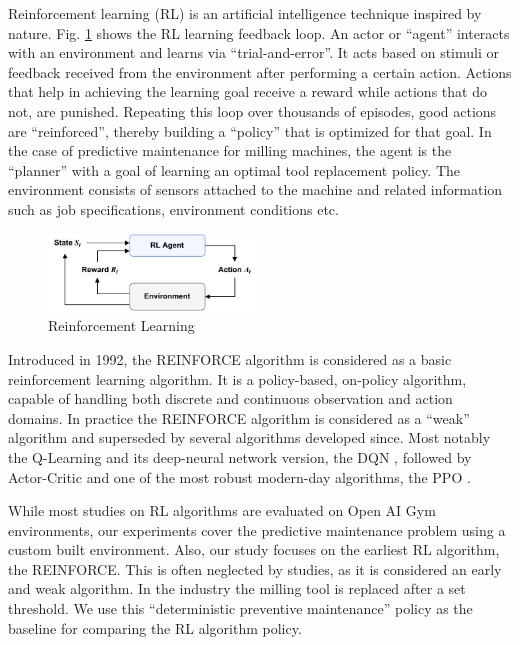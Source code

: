 \documentclass[a4paper, 12pt]{article}
\begin{document}
Reinforcement learning (RL) is an artificial intelligence technique inspired by nature. Fig. \ref{fig:RL-loop} \citep{barto2018} shows the RL learning feedback loop. An actor or ``agent'' interacts with an environment and learns via ``trial-and-error''. It acts based on stimuli or feedback received from the environment after performing a certain action. Actions that help in achieving the learning goal receive a reward while actions that do not, are punished. Repeating this loop over thousands of episodes, good actions are ``reinforced'', thereby building a ``policy'' that is optimized for that goal. In the case of predictive maintenance for milling machines, the agent is the ``planner'' with a goal of learning an optimal tool replacement policy. The environment consists of sensors attached to the machine and related information such as job specifications, environment conditions etc.

\begin{figure}[!h]
	\centering
	\includegraphics[width=0.5\textwidth]{RL-loop.pdf}
	\caption{Reinforcement Learning}
	\label{fig:RL-loop}
\end{figure}

Introduced in 1992, the REINFORCE algorithm \citep{REINFORCE-williams1992} is considered as a basic reinforcement learning algorithm. It is a policy-based, on-policy algorithm, capable of handling both discrete and continuous observation and action domains. In practice the REINFORCE algorithm is considered as a ``weak'' algorithm and superseded by several algorithms developed since. Most notably the Q-Learning and its deep-neural network version, the DQN \citep{DQN-mnih2013}, followed by Actor-Critic \citep{A2C-mnih2016} and one of the most robust modern-day algorithms, the PPO \citep{PPO-schulman2017}.

While most studies on RL algorithms are evaluated on Open AI Gym environments, our experiments cover the predictive maintenance problem using a custom built environment. Also, our study focuses on the earliest RL algorithm, the REINFORCE. This is often neglected by studies, as it is considered an early and weak algorithm. In the industry the milling tool is replaced after a set threshold. We use this ``deterministic preventive maintenance'' policy as the baseline for comparing the RL algorithm policy. 
\end{document}

